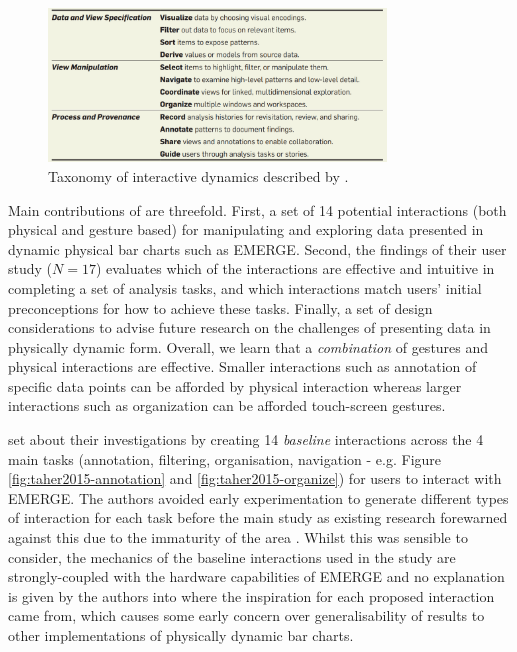 \documentclass[11pt]{article}
\begin{document}
\begin{figure}[H]
\centering
\includegraphics[width=0.8\textwidth]{img/heer2012-taxonomy.png} 
\caption{Taxonomy of interactive dynamics described by \protect\citet{heer2012}.}\label{fig:heer2012-taxonomy}
\end{figure}

Main contributions of \citet{taher2015} are threefold. First, a set of 14 potential interactions (both physical and gesture based) for manipulating and exploring data presented in dynamic physical bar charts such as EMERGE. Second, the findings of their user study ($N=17$) evaluates which of the interactions are effective and intuitive in completing a set of analysis tasks, and which interactions match users' initial preconceptions for how to achieve these tasks. Finally, a set of design considerations to advise future research on the challenges of presenting data in physically dynamic form. Overall, we learn that a \textit{combination} of gestures and physical interactions are effective. Smaller interactions such as annotation of specific data points can be afforded by physical interaction whereas larger interactions such as organization can be afforded touch-screen gestures. 

\citeauthor{taher2015} set about their investigations by creating 14 \textit{baseline} interactions across the 4 main tasks (annotation, filtering, organisation, navigation - e.g. Figure \ref{fig:taher2015-annotation} and \ref{fig:taher2015-organize}) for users to interact with EMERGE. The authors avoided early experimentation to generate different types of interaction for each task before the main study as existing research forewarned against this due to the immaturity of the area \citep{hornbaek2013}. Whilst this was sensible to consider, the mechanics of the baseline interactions used in the study are strongly-coupled with the hardware capabilities of EMERGE and no explanation is given by the authors into where the inspiration for each proposed interaction came from, which causes some early concern over generalisability of results to other implementations of physically dynamic bar charts.
\end{document}
